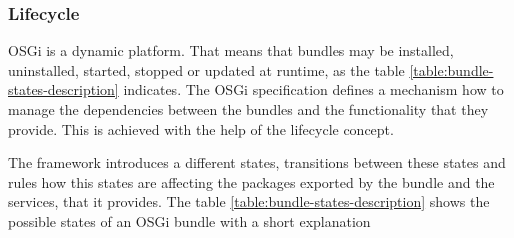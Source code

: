 \subsubsection{Lifecycle}
OSGi is a dynamic platform. That means that bundles may be installed, uninstalled, started, stopped or updated at runtime, as the table
\ref{table:bundle-states-description} indicates. The OSGi specification defines a mechanism how to manage the dependencies between 
the bundles and the functionality that they provide. This is achieved with the help of the lifecycle concept.

The framework introduces a different states, transitions between these states and rules how this states are affecting the packages 
exported by the bundle and the services, that it provides. The table \ref{table:bundle-states-description} shows the possible states 
of an OSGi bundle with a short explanation

